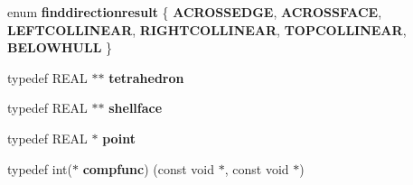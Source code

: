 \begin{DoxyCompactItemize}
\mbox{\label{classStemMesh3D_1_1tetgenmesh_a569afa21157dde381da3156e4f9ba377}} 
enum {\bfseries finddirectionresult} \{ \newline
{\bfseries A\+C\+R\+O\+S\+S\+E\+D\+GE}, 
{\bfseries A\+C\+R\+O\+S\+S\+F\+A\+CE}, 
{\bfseries L\+E\+F\+T\+C\+O\+L\+L\+I\+N\+E\+AR}, 
{\bfseries R\+I\+G\+H\+T\+C\+O\+L\+L\+I\+N\+E\+AR}, 
\newline
{\bfseries T\+O\+P\+C\+O\+L\+L\+I\+N\+E\+AR}, 
{\bfseries B\+E\+L\+O\+W\+H\+U\+LL}
 \}
\item 
\mbox{\label{classStemMesh3D_1_1tetgenmesh_a0b0a0adbcf9f3ce0befe5bfbc491ed07}} 
typedef R\+E\+AL $\ast$$\ast$ {\bfseries tetrahedron}
\item 
\mbox{\label{classStemMesh3D_1_1tetgenmesh_ae33cf3d2d3f1041b81317cf64abc5d7e}} 
typedef R\+E\+AL $\ast$$\ast$ {\bfseries shellface}
\item 
\mbox{\label{classStemMesh3D_1_1tetgenmesh_a331d48b97ab35ae6e088fd9fe9c9355b}} 
typedef R\+E\+AL $\ast$ {\bfseries point}
\item 
\mbox{\label{classStemMesh3D_1_1tetgenmesh_a5899e49ef7c1e04977cae322b3cc6a9b}} 
typedef int($\ast$ {\bfseries compfunc}) (const void $\ast$, const void $\ast$)
\end{DoxyCompactItemize}
